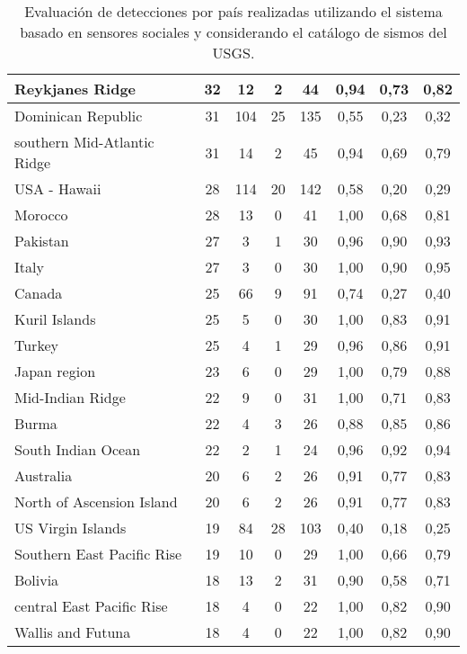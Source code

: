 {\begin{table}[!ht]
\begin{tabular}{|l|ccc|c|ccc|}
Reykjanes Ridge	 & 32 	 & 12 	 & 2 	& 44	 & 0,94 &	0,73 &	0,82 \\ \hline
Dominican Republic	 & 31 	 & 104 	 & 25 	& 135	 & 0,55 &	0,23 &	0,32 \\ \hline
southern Mid-Atlantic Ridge	 & 31 	 & 14 	 & 2 	& 45	 & 0,94 &	0,69 &	0,79 \\ \hline
USA - Hawaii	 & 28 	 & 114 	 & 20 	& 142	 & 0,58 &	0,20 &	0,29 \\ \hline
Morocco	 & 28 	 & 13 	 & 0   	& 41	 & 1,00 &	0,68 &	0,81 \\ \hline
Pakistan	 & 27 	 & 3 	 & 1 	& 30	 & 0,96 &	0,90 &	0,93 \\ \hline
Italy	 & 27 	 & 3 	 & 0   	& 30	 & 1,00 &	0,90 &	0,95 \\ \hline
Canada	 & 25 	 & 66 	 & 9 	& 91	 & 0,74 &	0,27 &	0,40 \\ \hline
Kuril Islands	 & 25 	 & 5 	 & 0   	& 30	 & 1,00 &	0,83 &	0,91 \\ \hline
Turkey	 & 25 	 & 4 	 & 1 	& 29	 & 0,96 &	0,86 &	0,91 \\ \hline
Japan region	 & 23 	 & 6 	 & 0   	& 29	 & 1,00 &	0,79 &	0,88 \\ \hline
Mid-Indian Ridge	 & 22 	 & 9 	 & 0   	& 31	 & 1,00 &	0,71 &	0,83 \\ \hline
Burma	 & 22 	 & 4 	 & 3 	& 26	 & 0,88 &	0,85 &	0,86 \\ \hline
South Indian Ocean	 & 22 	 & 2 	 & 1 	& 24	 & 0,96 &	0,92 &	0,94 \\ \hline
Australia	 & 20 	 & 6 	 & 2 	& 26	 & 0,91 &	0,77 &	0,83 \\ \hline
North of Ascension Island	 & 20 	 & 6 	 & 2 	& 26	 & 0,91 &	0,77 &	0,83 \\ \hline
US Virgin Islands	 & 19 	 & 84 	 & 28 	& 103	 & 0,40 &	0,18 &	0,25 \\ \hline
Southern East Pacific Rise	 & 19 	 & 10 	 & 0   	& 29	 & 1,00 &	0,66 &	0,79 \\ \hline
Bolivia	 & 18 	 & 13 	 & 2 	& 31	 & 0,90 &	0,58 &	0,71 \\ \hline
central East Pacific Rise	 & 18 	 & 4 	 & 0   	& 22	 & 1,00 &	0,82 &	0,90 \\ \hline
Wallis and Futuna	 & 18 	 & 4 	 & 0   	& 22	 & 1,00 &	0,82 &	0,90 \\ \hline
   \end{tabular}
  \caption{Evaluación de detecciones por país realizadas utilizando el sistema basado en sensores sociales y considerando el catálogo de sismos del USGS.}
  \label{table:all-detections-02}
\end{table}}

